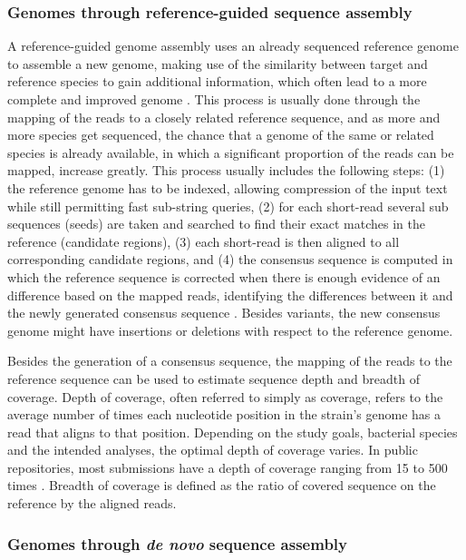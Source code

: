 \subsubsection{Genomes through reference-guided sequence assembly}

A reference-guided genome assembly uses an already sequenced reference genome to assemble a new genome, making use of the similarity between target and reference species to gain additional information, which often lead to a more complete and improved genome \citep{rausch_consistency-based_2009, lischer_reference-guided_2017}. 
This process is usually done through the mapping of the reads to a closely related reference sequence, and as more and more species get sequenced, the chance that a genome of the same or related species is already available, in which a significant proportion of the reads can be mapped, increase greatly. 
This process usually includes the following steps: (1) the reference genome has to be indexed, allowing compression of the input text while still permitting fast sub-string queries, (2) for each short-read several sub sequences (seeds) are taken and searched to find their exact matches in the reference  (candidate regions), (3) each short-read is then aligned to all corresponding candidate regions, and (4) the consensus sequence is computed in which the reference sequence is corrected when there is enough evidence of an difference based on the mapped
reads, identifying the differences between it and the newly generated consensus sequence \citep{bayat_methods_2020}.
Besides variants, the new consensus genome might have insertions or deletions with respect to the reference genome.

Besides the generation of a consensus sequence, the mapping of the reads to the reference sequence can be used to estimate sequence depth and breadth of coverage. 
Depth of coverage, often referred to simply as coverage, refers to the average number of times each nucleotide position in the strain's genome has a read that aligns to that position. Depending on the study goals, bacterial species and the intended analyses, the optimal depth of coverage varies. 
In public repositories, most submissions have a depth of coverage ranging from 15 to 500 times \citep{carrico_primer_2018}. 
Breadth of coverage is defined as the ratio of covered sequence on the reference by the aligned reads.

\subsubsection{Genomes through \textit{de novo} sequence assembly}

